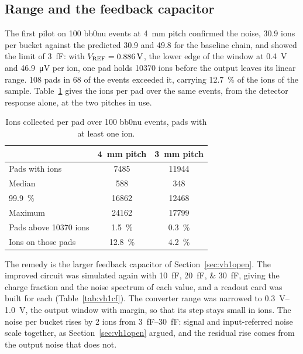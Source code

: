 \documentclass[11pt,a4paper]{article}
\begin{document}
\subsection{Range and the feedback capacitor}
\label{sec:vh1range}
%
The first pilot on \SI{100}{} bb0nu events at \SI{4}{mm} pitch confirmed the
noise, \SI{30.9}{} ions per bucket against the predicted \SI{30.9}{} and
\SI{49.8}{} for the baseline chain, and showed the limit of \SI{3}{fF}: with
$V_{\rm REF}=\SI{0.886}{V}$, the lower edge of the window at \SI{0.4}{V} and
\SI{46.9}{\micro V} per ion, one pad holds \SI{10370}{} ions before the
output leaves its linear range. \SI{108}{} pads in \SI{68}{} of the events
exceeded it, carrying \SI{12.7}{\percent} of the ions of the sample.
Table~\ref{tab:vh1pads} gives the ions per pad over the same events, from
the detector response alone, at the two pitches in use.
%
\begin{table}[htbp]\centering
\caption{Ions collected per pad over \SI{100}{} bb0nu events, pads with
at least one ion.}
\begin{tabular}{lcc}
\toprule
 & \SI{4}{mm} pitch & \SI{3}{mm} pitch\\
\midrule
Pads with ions & 7485 & 11944\\
Median & 588 & 348\\
\SI{99.9}{\percent} & 16862 & 12468\\
Maximum & 24162 & 17799\\
Pads above \SI{10370}{} ions & \SI{1.5}{\percent} & \SI{0.3}{\percent}\\
Ions on those pads & \SI{12.8}{\percent} & \SI{4.2}{\percent}\\
\bottomrule
\end{tabular}
\label{tab:vh1pads}
\end{table}
%
The remedy is the larger feedback capacitor of Section~\ref{sec:vh1open}.
The improved circuit was simulated again with \SIlist{10;20;30}{fF}, giving
the charge fraction and the noise spectrum of each value, and a readout
card was built for each (Table~\ref{tab:vh1cf}). The converter range was
narrowed to \SIrange{0.3}{1.0}{V}, the output window with margin, so that
its step stays small in ions. The noise per bucket rises by \SI{2}{} ions
from \SIrange{3}{30}{fF}: signal and input-referred noise scale together,
as Section~\ref{sec:vh1open} argued, and the residual rise comes from the
output noise that does not.
%
\end{document}
